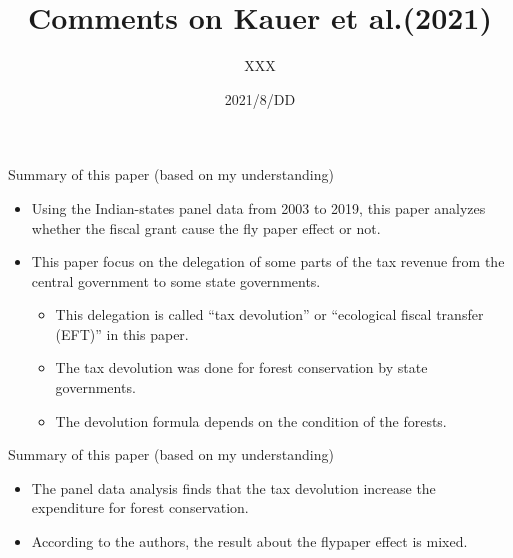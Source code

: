 \documentclass[
  ignorenonframetext,
]{beamer}
\title{Comments on Kauer et al.(2021)}
\author{XXX}
\date{2021/8/DD}
\providecommand{\tightlist}{%
  \setlength{\itemsep}{0pt}\setlength{\parskip}{0pt}}
\begin{document}
\frame{\titlepage}

\begin{frame}{Summary of this paper (based on my understanding)}
\protect\hypertarget{summary-of-this-paper-based-on-my-understanding}{}

\begin{itemize}
\tightlist
\item
  Using the Indian-states panel data from 2003 to 2019, this paper
  analyzes whether the fiscal grant cause the fly paper effect or not.
\item
  This paper focus on the delegation of some parts of the tax revenue
  from the central government to some state governments.

  \begin{itemize}
  \tightlist
  \item
    This delegation is called ``tax devolution'' or ``ecological fiscal
    transfer (EFT)'' in this paper.
  \item
    The tax devolution was done for forest conservation by state
    governments.
  \item
    The devolution formula depends on the condition of the forests.
  \end{itemize}
\end{itemize}

\end{frame}

\begin{frame}{Summary of this paper (based on my understanding)}
\protect\hypertarget{summary-of-this-paper-based-on-my-understanding-1}{}

\begin{itemize}
\tightlist
\item
  The panel data analysis finds that the tax devolution increase the
  expenditure for forest conservation.
\item
  According to the authors, the result about the flypaper effect is
  mixed.
\end{itemize}

\end{frame}
\end{document}
